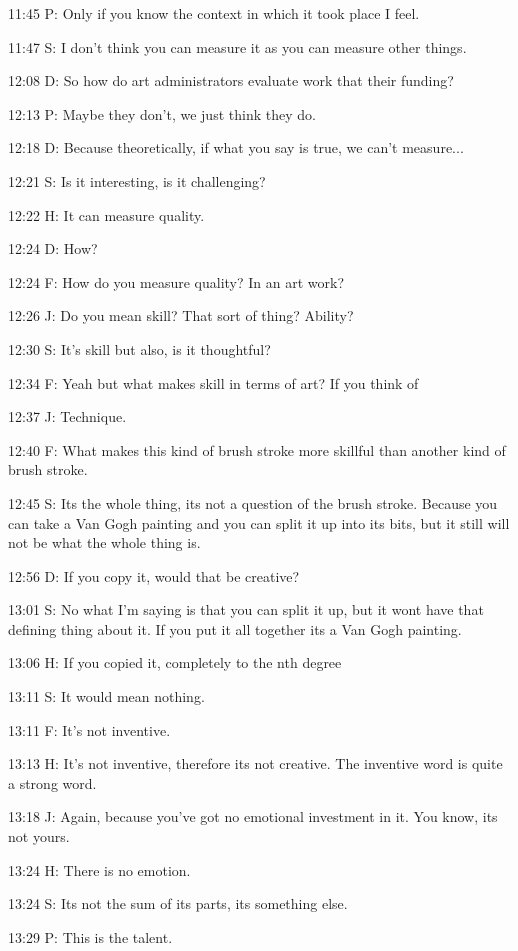 11:45 P: Only if you know the context in which it took place I feel.

11:47 S: I don't think you can measure it as you can measure other things.

12:08 D: So how do art administrators evaluate work that their funding?

12:13 P: Maybe they don't, we just think they do.

12:18 D: Because theoretically, if what you say is true, we can't measure...

12:21 S: Is it interesting, is it challenging?

12:22 H: It can measure quality.

12:24 D: How?

12:24 F: How do you measure quality? In an art work?

12:26 J: Do you mean skill? That sort of thing? Ability?

12:30 S: It's skill but also, is it thoughtful?

12:34 F: Yeah but what makes skill in terms of art? If you think of

12:37 J: Technique.

12:40 F: What makes this kind of brush stroke more skillful than another kind of brush stroke.

12:45 S: Its the whole thing, its not a question of the brush stroke. Because you can take a Van Gogh painting and you can split it up into its bits, but it still will not be what the whole thing is.

12:56 D: If you copy it, would that be creative?

13:01 S: No what I'm saying is that you can split it up, but it wont have that defining thing about it. If you put it all together its a Van Gogh painting.

13:06 H: If you copied it, completely to the nth degree

13:11 S: It would mean nothing.

13:11 F: It's not inventive.

13:13 H: It's not inventive, therefore its not creative. The inventive word is quite a strong word.

13:18 J: Again, because you've got no emotional investment in it. You know, its not yours.

13:24 H: There is no emotion.

13:24 S: Its not the sum of its parts, its something else.

13:29 P: This is the talent.

